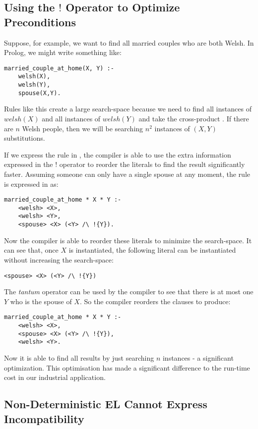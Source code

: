 \subsection{Using the $!$ Operator to Optimize Preconditions}
\label{optimizingpreconditions}
Suppose, for example, we want to find all married couples who are both Welsh.
In Prolog, we might write something like:
\begin{verbatim}
married_couple_at_home(X, Y) :-
    welsh(X),
    welsh(Y),
    spouse(X,Y).
\end{verbatim}	
Rules like this create a large search-space because we need to find all instances of $welsh(X)$ and all instances of  $welsh(Y)$ and take the cross-product \cite{smith-and-genesereth}. If there are $n$ Welsh people, then we will be searching $n^2$ instances of $(X,Y)$ substitutions.

If we express the rule in \ELFULL{}, the compiler is able to use the extra information expressed in the $!$ operator to reorder the literals to find the result significantly faster.
Assuming someone can only have a single spouse at any moment, the rule is expressed in \ELFULL{} as:
\begin{verbatim}
married_couple_at_home * X * Y :-
    <welsh> <X>,
    <welsh> <Y>,
    <spouse> <X> (<Y> /\ !{Y}).
\end{verbatim}	
Now the compiler is able to reorder these literals to minimize the search-space. 
It can see that, once $X$ is instantiated, the following literal can be instantiated without increasing the search-space:
\begin{verbatim}
<spouse> <X> (<Y> /\ !{Y})
\end{verbatim}
The \emph{tantum} operator can be used by the compiler to see that there is at most one $Y$ who is the spouse of $X$.
So the compiler reorders the clauses to produce:
\begin{verbatim}
married_couple_at_home * X * Y :-
    <welsh> <X>,
    <spouse> <X> (<Y> /\ !{Y}),
    <welsh> <Y>.
\end{verbatim}	
Now it is able to find all results by just searching $n$ instances - a significant optimization.
This optimisation has made a significant difference to the run-time cost in our industrial application.


\subsection{Non-Deterministic EL Cannot Express Incompatibility}


